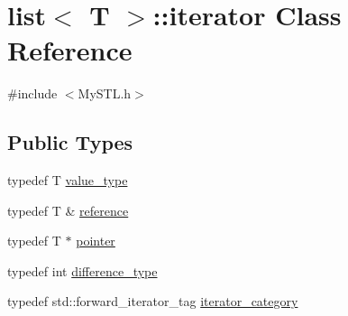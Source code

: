 \section{list$<$ T $>$::iterator Class Reference}
\label{classlist_1_1iterator}


{\ttfamily \#include $<$MySTL.h$>$}

\subsection*{Public Types}
\begin{DoxyCompactItemize}
\item 
typedef T \hyperlink{classlist_1_1iterator_a16a37ebb2080acea47a55dd72a9753c2}{value\_\-type}
\item 
typedef T \& \hyperlink{classlist_1_1iterator_a67117308303156c5b6419ad9439d2376}{reference}
\item 
typedef T $\ast$ \hyperlink{classlist_1_1iterator_ac23aff59f93df3d2faf295726c1d2bba}{pointer}
\item 
typedef int \hyperlink{classlist_1_1iterator_ab83deb8c04d29397c5a52f2b4650c8a2}{difference\_\-type}
\item 
typedef std::forward\_\-iterator\_\-tag \hyperlink{classlist_1_1iterator_a0fc7ae9079b9de2179f52ef32968d834}{iterator\_\-category}
\end{DoxyCompactItemize}
